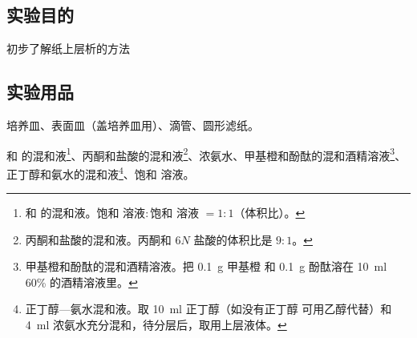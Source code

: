 \subsection*{实验目的}
初步了解纸上层析的方法

\subsection*{实验用品}
培养皿、表面皿（盖培养皿用）、滴管、圆形滤纸。

 和  的混和液\footnote{ 和  的混和液。饱和  溶液$:$饱和  溶液 ${}=1:1$（体积比）。}、丙酮和盐酸的混和液\footnote{丙酮和盐酸的混和液。丙酮和 $6N$ 盐酸的体积比是 $9:1$。}、浓氨水、甲基橙和酚酞的混和酒精溶液\footnote{甲基橙和酚酞的混和酒精溶液。把 \qty{0.1}{g} 甲基橙 和 \qty{0.1}{g} 酚酞溶在 \qty{10}{ml} 60\% 的酒精溶液里。}、正丁醇和氨水的混和液\footnote{正丁醇—氨水混和液。取 \qty{10}{ml} 正丁醇（如没有正丁醇 可用乙醇代替）和 \qty{4}{ml} 浓氨水充分混和，待分层后，取用上层液体。}、饱和  溶液。
